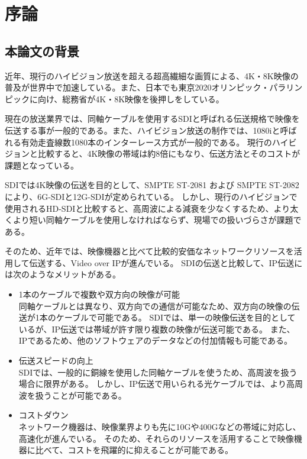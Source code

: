 \chapter{序論}
\label{chap:introduction}

\section{本論文の背景}
近年、現行のハイビジョン放送を超える超高繊細な画質による、4K・8K映像の普及が世界中で加速している。また、日本でも東京2020オリンピック・パラリンピックに向け、総務省が4K・8K映像を後押しをしている。

現在の放送業界では、同軸ケーブルを使用するSDIと呼ばれる伝送規格で映像を伝送する事が一般的である。また、ハイビジョン放送の制作では、1080iと呼ばれる有効走査線数1080本のインターレース方式が一般的である。
現行のハイビジョンと比較すると、4K映像の帯域は約8倍にもなり、伝送方法とそのコストが課題となっている。

SDIでは4K映像の伝送を目的として、SMPTE ST-2081 および SMPTE ST-2082により、6G-SDIと12G-SDIが定められている。
しかし、現行のハイビジョンで使用されるHD-SDIと比較すると、高周波による減衰を少なくするため、より太くより短い同軸ケーブルを使用しなければならず、現場での扱いづらさが課題である。

そのため、近年では、映像機器と比べて比較的安価なネットワークリソースを活用して伝送する、Video over IPが進んでいる。
SDIの伝送と比較して、IP伝送には次のようなメリットがある\cite{kodera-interbee2015}。

\begin{itemize}
  \item 1本のケーブルで複数や双方向の映像が可能\mbox{}\\
    同軸ケーブルとは異なり、双方向での通信が可能なため、双方向の映像の伝送が1本のケーブルで可能である。
    SDIでは、単一の映像伝送を目的としているが、IP伝送では帯域が許す限り複数の映像が伝送可能である。
    また、IPであるため、他のソフトウェアのデータなどの付加情報も可能である。
  \item 伝送スピードの向上\mbox{}\\
    SDIでは、一般的に銅線を使用した同軸ケーブルを使うため、高周波を扱う場合に限界がある。
    しかし、IP伝送で用いられる光ケーブルでは、より高周波を扱うことが可能である。
  \item コストダウン\mbox{}\\
    ネットワーク機器は、映像業界よりも先に10Gや400Gなどの帯域に対応し、高速化が進んでいる。
    そのため、それらのリソースを活用することで映像機器に比べて、コストを飛躍的に抑えることが可能である。
\end{itemize}

